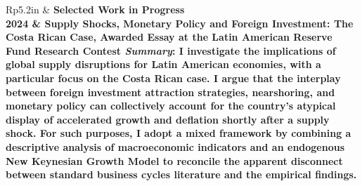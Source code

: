 \documentclass[letterpaper, 11pt]{article}
\newcommand{\headingfont}{\bfseries\Large\color{ChadDarkBlue}}
\newenvironment{SectionTable}[1]{
	\renewcommand*{\arraystretch}{1.7}
	\setlength{\tabcolsep}{10pt}
	\begin{longtable}{Rp{5.2in}} & #1 \\}
{\end{longtable}\vspace{-1cm}}
\begin{document}
\begin{SectionTable}{\headingfont Selected Work in Progress}
2024 & 
\textbf{Supply Shocks, Monetary Policy and Foreign Investment: The Costa Rican Case}, Awarded Essay at the Latin American Reserve Fund Research Contest\vspace{2mm} \newline
\small \textit{Summary}: I investigate the implications of global supply disruptions for Latin American economies, with a particular focus on the Costa Rican case. I argue that the interplay between foreign investment attraction strategies, nearshoring, and monetary policy can collectively account for the country’s atypical display of accelerated growth and deflation shortly after a supply shock. For such purposes, I adopt a mixed framework by combining a descriptive analysis of macroeconomic indicators and an endogenous New Keynesian Growth Model to reconcile the apparent disconnect between standard business cycles literature and the empirical findings.\\

\end{SectionTable}







\end{document}

